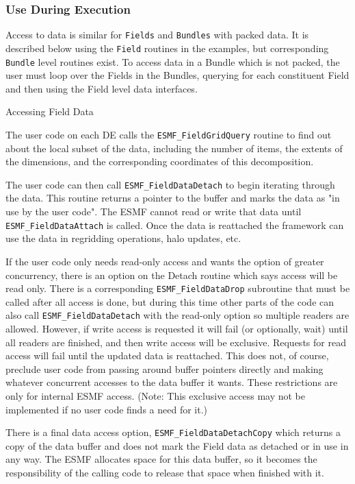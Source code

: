 \subsubsection{Use During Execution}

Access to data is similar for {\tt Fields} and {\tt Bundles} with
packed data.  It is described below using the {\tt Field}
routines in the examples, but corresponding {\tt Bundle} level
routines exist.  To access data in a
Bundle which is not packed, the user must loop over the
Fields in the Bundles, querying for each
constituent Field and then using the Field level data interfaces.

\begin{description}

\item{Accessing Field Data}

The user code on each DE calls the {\tt ESMF\_FieldGridQuery}
routine to find out about the local subset of the data, including
the number of items, the extents
of the dimensions, and the corresponding coordinates of this
decomposition.

The user code can then call {\tt ESMF\_FieldDataDetach} to
begin iterating through the data.  This routine returns a
pointer to the buffer and marks the data as "in use by
the user code".  The ESMF cannot read or write that
data until {\tt ESMF\_FieldDataAttach} is called.  Once the data
is reattached the framework can use the data in regridding 
operations, halo updates, etc.  

If the user code only needs read-only access and wants
the option of greater concurrency, there is an option on the
Detach routine which says access will be read only.  There is
a corresponding {\tt ESMF\_FieldDataDrop} subroutine that must be called
after all access is done, but during this time other parts of
the code can also call {\tt ESMF\_FieldDataDetach} with the read-only
option so multiple readers are allowed.  However, if write access
is requested it will fail (or optionally, wait) until all readers 
are finished, and
then write access will be exclusive.   Requests for read access
will fail until the updated data is reattached. 
This does not, of course, preclude user code from passing around
buffer pointers directly and making whatever concurrent accesses to the
data buffer it wants.  These restrictions are only for internal
ESMF access.
(Note: This exclusive access may not be implemented if no user
code finds a need for it.)

There is a final data access option, {\tt ESMF\_FieldDataDetachCopy}
which returns a copy of the data buffer and does not mark the
Field data as detached or in use in any way.  The ESMF 
allocates space for this data buffer, so it becomes the
responsibility of the calling code to release that space 
when finished with it.

\end{description}


